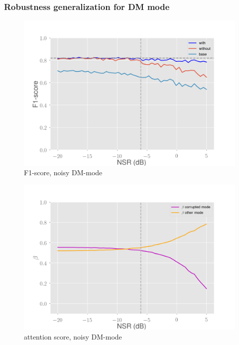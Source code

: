 \documentclass[10pt]{beamer}
\begin{document}
\begin{frame}
\frametitle{Robustness generalization for DM mode}
\begin{multicols}{2}
\begin{figure}
\centering
\begin{overprint}
    \includegraphics[scale=0.2]{figs/noise-generalisation-dm-noisy}
\end{overprint}
\caption{F1-score, noisy DM-mode}
\end{figure}
\columnbreak
\begin{figure}
\centering
\begin{overprint}
    \includegraphics[scale=0.2]{figs/normal-ip-noisy-beta}
\end{overprint}
\caption{attention score, noisy DM-mode}
\end{figure}
\end{multicols}
\end{frame}
\end{document}
